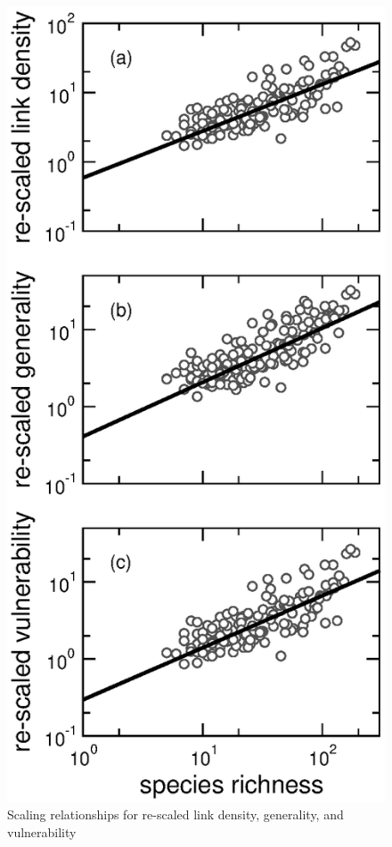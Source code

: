 \documentclass[12pt]{article}
\begin{document}
\begin{figure}[h]
\centerline{\includegraphics*[height=.5\textheight]{Figures/by_TL/scaling_with_S/proportions/S_fitlines_nonts_new.eps}}
\caption{Scaling relationships for re-scaled link density, generality, and vulnerability 
}
\end{figure}
\end{document}
